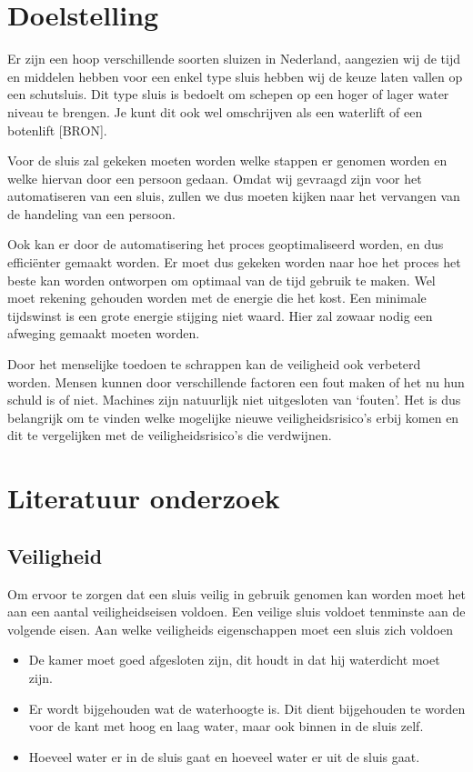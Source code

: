 \documentclass{article}
\begin{document}
\clearpage %
\section{Doelstelling}
Er zijn een hoop verschillende soorten sluizen in Nederland, aangezien wij de tijd en middelen hebben voor een enkel type sluis hebben wij de keuze laten vallen op een schutsluis. Dit type sluis is bedoelt om schepen op een hoger of lager water niveau te brengen. Je kunt dit ook wel omschrijven als een waterlift of een botenlift [BRON].

Voor de sluis zal gekeken moeten worden welke stappen er genomen worden en welke hiervan door een persoon gedaan. Omdat wij gevraagd zijn voor het automatiseren van een sluis, zullen we dus moeten kijken naar het vervangen van de handeling van een persoon.

Ook kan er door de automatisering het proces geoptimaliseerd worden, en dus efficiënter gemaakt worden. Er moet dus gekeken worden naar hoe het proces het beste kan worden ontworpen om optimaal van de tijd gebruik te maken. Wel moet rekening gehouden worden met de energie die het kost. Een minimale tijdswinst is een grote energie stijging niet waard. Hier zal zowaar nodig een afweging gemaakt moeten worden.

Door het menselijke toedoen te schrappen kan de veiligheid ook verbeterd worden. Mensen kunnen door verschillende factoren een fout maken of het nu hun schuld is of niet. Machines zijn natuurlijk niet uitgesloten van ‘fouten’. Het is dus belangrijk om te vinden welke mogelijke nieuwe veiligheidsrisico’s erbij komen en dit te vergelijken met de veiligheidsrisico’s die verdwijnen.


\clearpage %
\section{Literatuur onderzoek} %

\subsection{Veiligheid}
Om ervoor te zorgen dat een sluis veilig in gebruik genomen kan worden moet het aan een aantal veiligheidseisen voldoen. Een veilige sluis voldoet tenminste aan de volgende eisen.
Aan welke veiligheids eigenschappen moet een sluis zich voldoen
\begin{itemize}
\item De kamer moet goed afgesloten zijn, dit houdt in dat hij waterdicht moet zijn.
\item Er wordt bijgehouden wat de waterhoogte is. Dit dient bijgehouden te worden voor de kant met hoog en laag water, maar ook binnen in de sluis zelf.
\item Hoeveel water er in de sluis gaat en hoeveel water er uit de sluis gaat.
\end{itemize}
\end{document}
